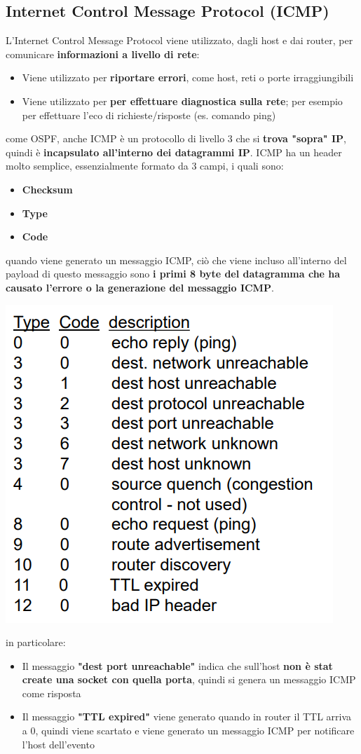 \documentclass[12pt]{article}
\begin{document}
\subsection{Internet Control Message Protocol (ICMP)}
L'Internet Control Message Protocol viene utilizzato, dagli host e dai router, per comunicare \textbf{informazioni a livello di rete}:
\begin{itemize}
    \item Viene utilizzato per \textbf{riportare errori}, come host, reti o porte irraggiungibili 
    \item Viene utilizzato per \textbf{per effettuare diagnostica sulla rete}; per esempio per effettuare l'eco di richieste/risposte (es. comando ping)
\end{itemize}
come OSPF, anche ICMP è un protocollo di livello 3 che si \textbf{trova "sopra" IP}, quindi è \textbf{incapsulato all'interno dei datagrammi IP}.
ICMP ha un header molto semplice, essenzialmente formato da 3 campi, i quali sono:
\begin{itemize}
    \item \textbf{Checksum}
    \item \textbf{Type}
    \item \textbf{Code}
\end{itemize}
quando viene generato un messaggio ICMP, ciò che viene incluso all'interno del payload di questo messaggio sono \textbf{i primi 8 byte del datagramma che ha causato l'errore o la generazione del messaggio ICMP}.
\begin{center}
    \includegraphics[width =0.45\linewidth]{Images/116.png}
\end{center}
in particolare:
\begin{itemize}
    \item Il messaggio \textbf{"dest port unreachable"} indica che sull'host \textbf{non è stat create una socket con quella porta}, quindi si genera un messaggio ICMP come risposta
    \item Il messaggio \textbf{"TTL expired"} viene generato quando in router il TTL arriva a 0, quindi viene scartato e viene generato un messaggio ICMP per notificare l'host dell'evento
\end{itemize}
\end{document}
